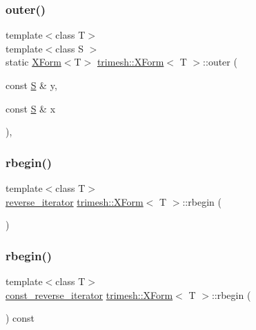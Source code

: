 \subsubsection{\texorpdfstring{outer()}{outer()}}
{\footnotesize\ttfamily template$<$class T$>$ \\
template$<$class S $>$ \\
static \hyperlink{classtrimesh_1_1XForm}{X\+Form}$<$T$>$ \hyperlink{classtrimesh_1_1XForm}{trimesh\+::\+X\+Form}$<$ T $>$\+::outer (\begin{DoxyParamCaption}\item[{const \hyperlink{ego_8cc_abde73cd36321648268fb4543509b996a}{S} \&}]{y,  }\item[{const \hyperlink{ego_8cc_abde73cd36321648268fb4543509b996a}{S} \&}]{x }\end{DoxyParamCaption})\hspace{0.3cm}{\ttfamily [inline]}, {\ttfamily [static]}}

\mbox{\label{classtrimesh_1_1XForm_a8a98f35aaf5fa6cd809020215cae3bc2}} 
\subsubsection{\texorpdfstring{rbegin()}{rbegin()}\hspace{0.1cm}{\footnotesize\ttfamily [1/2]}}
{\footnotesize\ttfamily template$<$class T$>$ \\
\hyperlink{classtrimesh_1_1XForm_a4729ea67a4ad434be421b066af3b672c}{reverse\+\_\+iterator} \hyperlink{classtrimesh_1_1XForm}{trimesh\+::\+X\+Form}$<$ T $>$\+::rbegin (\begin{DoxyParamCaption}{ }\end{DoxyParamCaption})\hspace{0.3cm}{\ttfamily [inline]}}

\mbox{\label{classtrimesh_1_1XForm_a34e2a37d8c9bce6b37f149afd2b23b68}} 
\subsubsection{\texorpdfstring{rbegin()}{rbegin()}\hspace{0.1cm}{\footnotesize\ttfamily [2/2]}}
{\footnotesize\ttfamily template$<$class T$>$ \\
\hyperlink{classtrimesh_1_1XForm_a00d4231576ef7499e29885da090e807f}{const\+\_\+reverse\+\_\+iterator} \hyperlink{classtrimesh_1_1XForm}{trimesh\+::\+X\+Form}$<$ T $>$\+::rbegin (\begin{DoxyParamCaption}{ }\end{DoxyParamCaption}) const\hspace{0.3cm}{\ttfamily [inline]}}


